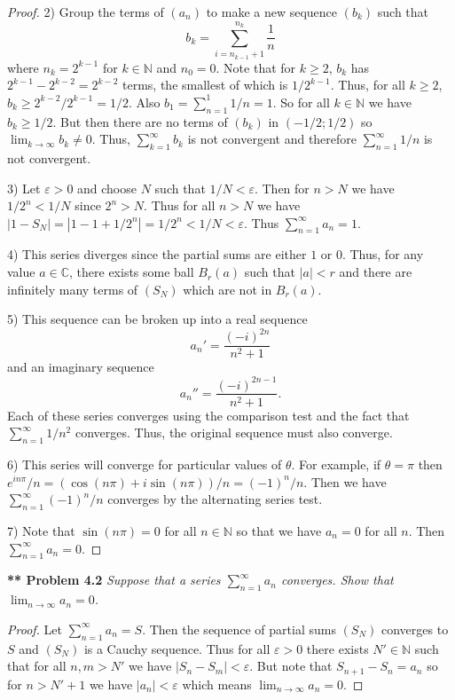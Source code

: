 \documentclass{article}
\begin{document}
\begin{flushleft}
\begin{proof}
2) Group the terms of $(a_n)$ to make a new sequence $(b_k)$ such that
\[
b_k = \sum_{i = n_{k-1} + 1}^{n_k} \frac{1}{n}
\]
where $n_k = 2^{k-1}$ for $k \in \mathbb{N}$ and $n_0 = 0$. Note that for $k \geq 2$, $b_k$ has $2^{k-1} - 2^{k-2} = 2^{k-2}$ terms, the smallest of which is $1/2^{k-1}$. Thus, for all $k \geq 2$, $b_k \geq 2^{k-2}/2^{k-1} = 1/2$. Also $b_1 = \sum_{n=1}^{1} 1/n = 1$. So for all $k \in \mathbb{N}$ we have $b_k \geq 1/2$. But then there are no terms of $(b_k)$ in $(-1/2 ; 1/2)$ so $\lim_{k \rightarrow \infty} b_k \neq 0$. Thus, $\sum_{k=1}^{\infty} b_k$ is not convergent and therefore $\sum_{n=1}^{\infty} 1/n$ is not convergent.\newline

3) Let $\varepsilon > 0$ and choose $N$ such that $1/N < \varepsilon$. Then for $n > N$ we have $1/2^n < 1/N$ since $2^n > N$. Thus for all $n > N$ we have $|1 - S_N| = |1 - 1 + 1/2^n| = 1/2^n < 1/N < \varepsilon$. Thus $\sum_{n=1}^{\infty} a_n = 1$.\newline

4) This series diverges since the partial sums are either $1$ or $0$. Thus, for any value $a \in \mathbb{C}$, there exists some ball $B_r(a)$ such that $|a| < r$ and there are infinitely many terms of $(S_N)$ which are not in $B_r(a)$.\newline

5) This sequence can be broken up into a real sequence
\[
a_n' = \frac{(-i)^{2n}}{n^2+1}
\]
and an imaginary sequence
\[
a_n'' = \frac{(-i)^{2n-1}}{n^2+1}.
\]
Each of these series converges using the comparison test and the fact that $\sum_{n=1}^{\infty} 1/n^2$ converges. Thus, the original sequence must also converge.\newline

6) This series will converge for particular values of $\theta$. For example, if $\theta = \pi$ then $e^{in\pi}/n = (\cos(n \pi) + i \sin(n \pi))/n = (-1)^n/n$. Then we have $\sum_{n=1}^{\infty} (-1)^n/n$ converges by the alternating series test.\newline

7) Note that $\sin(n \pi) = 0$ for all $n \in \mathbb{N}$ so that we have $a_n = 0$ for all $n$. Then $\sum_{n=1}^{\infty} a_n = 0$.
\end{proof}

\textbf{** Problem 4.2}
\textit{Suppose that a series $\sum_{n=1}^{\infty} a_n$ converges. Show that $\lim_{n \rightarrow \infty} a_n = 0$.}
\begin{proof}
Let $\sum_{n=1}^{\infty} a_n = S$. Then the sequence of partial sums $(S_N)$ converges to $S$ and $(S_N)$ is a Cauchy sequence. Thus for all $\varepsilon > 0$ there exists $N' \in \mathbb{N}$ such that for all $n,m > N'$ we have $|S_n - S_m| < \varepsilon$. But note that $S_{n+1} - S_n= a_n$ so for $n > N' + 1$ we have $|a_n| < \varepsilon$ which means $\lim_{n \rightarrow \infty} a_n = 0$.
\end{proof}


\end{flushleft}
\end{document}
